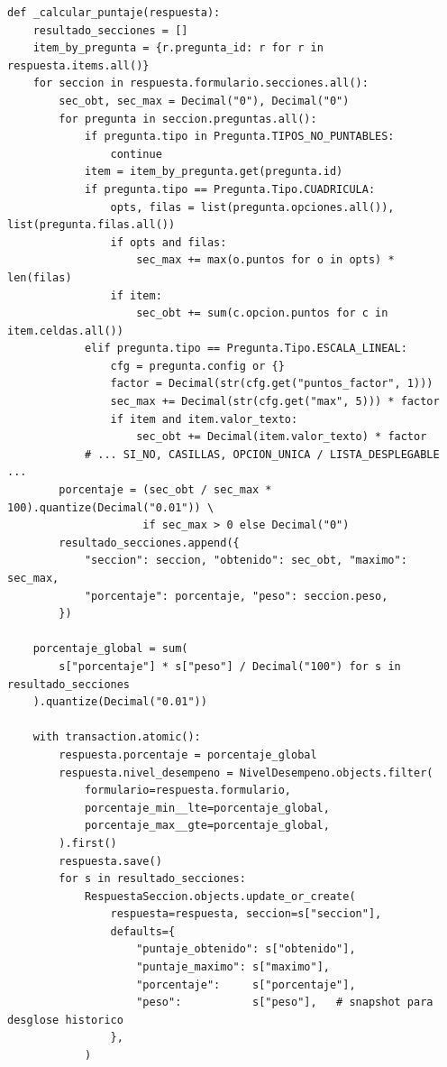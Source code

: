 \begin{lstlisting}[language={[3]Python}]
def _calcular_puntaje(respuesta):
    resultado_secciones = []
    item_by_pregunta = {r.pregunta_id: r for r in respuesta.items.all()}
    for seccion in respuesta.formulario.secciones.all():
        sec_obt, sec_max = Decimal("0"), Decimal("0")
        for pregunta in seccion.preguntas.all():
            if pregunta.tipo in Pregunta.TIPOS_NO_PUNTABLES:
                continue
            item = item_by_pregunta.get(pregunta.id)
            if pregunta.tipo == Pregunta.Tipo.CUADRICULA:
                opts, filas = list(pregunta.opciones.all()), list(pregunta.filas.all())
                if opts and filas:
                    sec_max += max(o.puntos for o in opts) * len(filas)
                if item:
                    sec_obt += sum(c.opcion.puntos for c in item.celdas.all())
            elif pregunta.tipo == Pregunta.Tipo.ESCALA_LINEAL:
                cfg = pregunta.config or {}
                factor = Decimal(str(cfg.get("puntos_factor", 1)))
                sec_max += Decimal(str(cfg.get("max", 5))) * factor
                if item and item.valor_texto:
                    sec_obt += Decimal(item.valor_texto) * factor
            # ... SI_NO, CASILLAS, OPCION_UNICA / LISTA_DESPLEGABLE ...
        porcentaje = (sec_obt / sec_max * 100).quantize(Decimal("0.01")) \
                     if sec_max > 0 else Decimal("0")
        resultado_secciones.append({
            "seccion": seccion, "obtenido": sec_obt, "maximo": sec_max,
            "porcentaje": porcentaje, "peso": seccion.peso,
        })

    porcentaje_global = sum(
        s["porcentaje"] * s["peso"] / Decimal("100") for s in resultado_secciones
    ).quantize(Decimal("0.01"))

    with transaction.atomic():
        respuesta.porcentaje = porcentaje_global
        respuesta.nivel_desempeno = NivelDesempeno.objects.filter(
            formulario=respuesta.formulario,
            porcentaje_min__lte=porcentaje_global,
            porcentaje_max__gte=porcentaje_global,
        ).first()
        respuesta.save()
        for s in resultado_secciones:
            RespuestaSeccion.objects.update_or_create(
                respuesta=respuesta, seccion=s["seccion"],
                defaults={
                    "puntaje_obtenido": s["obtenido"],
                    "puntaje_maximo": s["maximo"],
                    "porcentaje":     s["porcentaje"],
                    "peso":           s["peso"],   # snapshot para desglose historico
                },
            )
\end{lstlisting}

